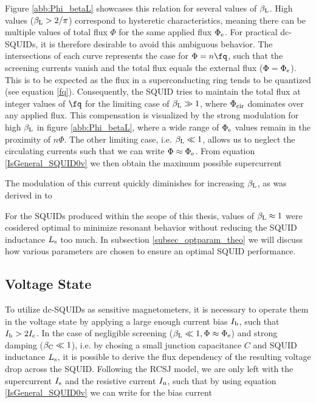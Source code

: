 Figure \ref{abb:Phi_betaL} showcases this relation for several values of $\beta_{\rm L}$. High values ($\beta_{\rm L}>2/\pi$) correspond to  hysteretic characteristics, meaning there can be multiple values of total flux $\Phi$ for the same applied flux $\Phi_{\rm e}$. For practical dc-SQUIDs, it is therefore desirable to avoid this ambiguous behavior. The intersections of each curve represents the case for $\Phi = n\unit{\fq}$, such that the screening currents vanish and the total flux equals the external flux ($\Phi=\Phi_{\rm e}$). This is to be expected as the flux in a superconducting ring tends to be quantized (see equation \ref{fq}). Consequently, the SQUID tries to maintain the total flux at integer values of $\unit{\fq}$ for the limiting case of $\beta_{\rm L}\gg 1$, where $\Phi_{\rm cir}$ dominates over any applied flux. This compensation is visualized by the strong modulation for high $\beta_{\rm L}$ in figure \ref{abb:Phi_betaL}, where a wide range of $\Phi_{\rm e}$ values remain in the proximity of $n\Phi$. The other limiting case, i.e. $\beta_{\rm L}\ll 1$, allows us to neglect the circulating currents such that we can write $\Phi \approx \Phi_{\rm e}$. From equation \ref{IsGeneral_SQUID0v} we then obtain the maximum possible supercurrent 


The modulation of this current quickly diminishes for increasing $\beta_{\rm L}$, as was derived in \cite{Clarke2004} to 


For the SQUIDs produced within the scope of this thesis, values of $\beta_{\rm L}\approx 1$ were cosidered optimal to minimize resonant behavior without reducing the SQUID inductance $L_{\rm s}$ too much. In subsection \ref{subsec_optparam_theo} we will discuss how various parameters are chosen to ensure an optimal SQUID performance.

\subsection{Voltage State}

To utilize dc-SQUIDs as sensitive magnetometers, it is necessary to operate them in the voltage state by applying a large enough current bias $I_{\rm b}$, such that $I_{\rm b}>2I_{\rm c}$. In the case of negligible screening ($\beta_{\rm L}\ll 1, \Phi\approx\Phi_{\rm e}$) and strong damping ($\beta_{\rm C}\ll 1$), i.e. by chosing a small junction capacitance $C$ and SQUID inductance $L_{\rm s}$, it is possible to derive the flux dependency of the resulting voltage drop across the SQUID. Following the RCSJ model, we are only left with the supercurrent $I_{\rm s}$ and the resistive current $I_{\rm n}$, such that by using equation \ref{IsGeneral_SQUID0v} we can write for the bias current 

